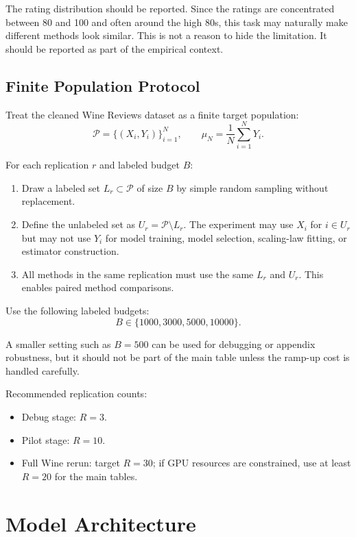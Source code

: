 \documentclass[11pt]{article}
\begin{document}
The rating distribution should be reported. Since the ratings are concentrated between 80 and 100 and often around the high 80s, this task may naturally make different methods look similar. This is not a reason to hide the limitation. It should be reported as part of the empirical context.

\subsection{Finite Population Protocol}

Treat the cleaned Wine Reviews dataset as a finite target population:
\[
\mathcal{P}=\{(X_i,Y_i)\}_{i=1}^N, \qquad
\mu_N = \frac{1}{N}\sum_{i=1}^N Y_i.
\]

For each replication $r$ and labeled budget $B$:

\begin{enumerate}
    \item Draw a labeled set $L_r \subset \mathcal{P}$ of size $B$ by simple random sampling without replacement.
    \item Define the unlabeled set as $U_r=\mathcal{P}\setminus L_r$. The experiment may use $X_i$ for $i\in U_r$ but may not use $Y_i$ for model training, model selection, scaling-law fitting, or estimator construction.
    \item All methods in the same replication must use the same $L_r$ and $U_r$. This enables paired method comparisons.
\end{enumerate}

Use the following labeled budgets:
\[
B\in\{1000,3000,5000,10000\}.
\]

A smaller setting such as $B=500$ can be used for debugging or appendix robustness, but it should not be part of the main table unless the ramp-up cost is handled carefully.

Recommended replication counts:

\begin{itemize}
    \item Debug stage: $R=3$.
    \item Pilot stage: $R=10$.
    \item Full Wine rerun: target $R=30$; if GPU resources are constrained, use at least $R=20$ for the main tables.
\end{itemize}

\section{Model Architecture}
\end{document}

